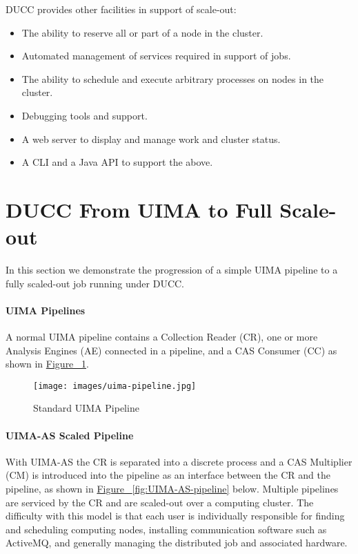     DUCC provides other facilities in support of scale-out:
    \begin{itemize}
      \item The ability to reserve all or part of a node in the cluster.
      \item Automated management of services required in support of jobs.
      \item The ability to schedule and execute arbitrary processes on nodes in the
        cluster.
      \item Debugging tools and support.
      \item A web server to display and manage work and cluster status.
      \item A CLI and a Java API to support the above.
    \end{itemize}
    
    \section{DUCC From UIMA to Full Scale-out}

    In this section we demonstrate the progression of a simple UIMA pipeline to a fully
    scaled-out job running under DUCC.

    \paragraph{UIMA Pipelines}
    A normal UIMA pipeline
    contains a Collection Reader (CR), one or more Analysis Engines (AE) connected in a pipeline, and a CAS
    Consumer (CC) as shown in \hyperref[fig:UIMA-pipeline]{Figure ~\ref{fig:UIMA-pipeline}}.

    \begin{figure}[H]
      \centering
      \texttt{[image: images/uima-pipeline.jpg]}
      \caption{Standard UIMA Pipeline}
      \label{fig:UIMA-pipeline}
    \end{figure}

    \paragraph{UIMA-AS  Scaled Pipeline}
    With UIMA-AS the CR is separated into a discrete process and a CAS Multiplier (CM) is introduced 
    into the pipeline as an interface between the CR and the pipeline, as shown in
    \hyperref[fig:UIMA-AS-pipeline]{Figure ~\ref{fig:UIMA-AS-pipeline}} below.
    Multiple pipelines are serviced by the 
    CR and are scaled-out over a computing cluster.  The difficulty with this model is that each
    user is individually responsible for finding and scheduling computing nodes, installing
    communication software such as ActiveMQ, and generally managing the distributed job and
    associated hardware.


